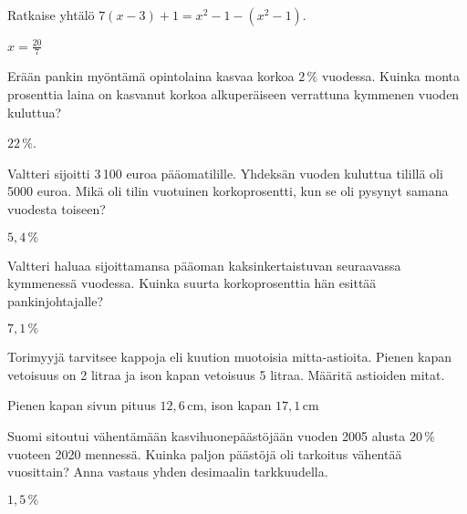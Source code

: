\begin{tehtavasivu}
\begin{tehtava}
	Ratkaise yhtälö $7(x-3)+1=x^2-1-(x^2-1)$.
    \begin{vastaus}
	$x=\frac{20}{7}$
    \end{vastaus}
\end{tehtava}


\begin{tehtava}
    Erään pankin myöntämä opintolaina kasvaa korkoa $2\,\%$ vuodessa. Kuinka monta 
    prosenttia laina on kasvanut korkoa alkuperäiseen verrattuna kymmenen vuoden kuluttua?
    \begin{vastaus}
        $22\,\%$.
    \end{vastaus}
\end{tehtava}

\begin{tehtava}%
Valtteri sijoitti 3\,100 euroa pääomatilille. Yhdeksän vuoden kuluttua tilillä oli 5000 euroa. Mikä oli tilin vuotuinen korkoprosentti, kun se oli pysynyt samana vuodesta toiseen? 
\begin{vastaus}
$5,4\,\%$
\end{vastaus}
\end{tehtava}
\begin{tehtava}%
Valtteri haluaa sijoittamansa pääoman kaksinkertaistuvan seuraavassa kymmenessä vuodessa. Kuinka suurta korkoprosenttia hän esittää pankinjohtajalle?
\begin{vastaus}
$7,1\,\%$
\end{vastaus}
\end{tehtava}

\begin{tehtava}%
Torimyyjä tarvitsee kappoja eli kuution muotoisia mitta-astioita. Pienen kapan vetoisuus on 2 litraa ja ison kapan vetoisuus 5 litraa. Määritä astioiden mitat.
\begin{vastaus}
Pienen kapan sivun pituus $12,6$\,cm, ison kapan $17,1$\,cm
\end{vastaus}
\end{tehtava}

\begin{tehtava}%
Suomi sitoutui vähentämään kasvihuonepäästöjään vuoden 2005 alusta $20\,\%$ vuoteen 2020 mennessä. Kuinka paljon päästöjä oli tarkoitus vähentää vuosittain? Anna vastaus yhden desimaalin tarkkuudella.
\begin{vastaus}
$1,5\,\%$
\end{vastaus}
\end{tehtava}


\end{tehtavasivu}

